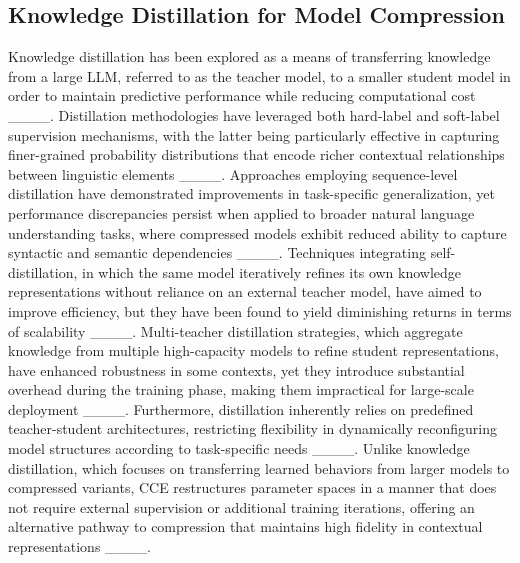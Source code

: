 \subsection{Knowledge Distillation for Model Compression}
Knowledge distillation has been explored as a means of transferring knowledge from a large LLM, referred to as the teacher model, to a smaller student model in order to maintain predictive performance while reducing computational cost ____. Distillation methodologies have leveraged both hard-label and soft-label supervision mechanisms, with the latter being particularly effective in capturing finer-grained probability distributions that encode richer contextual relationships between linguistic elements ____. Approaches employing sequence-level distillation have demonstrated improvements in task-specific generalization, yet performance discrepancies persist when applied to broader natural language understanding tasks, where compressed models exhibit reduced ability to capture syntactic and semantic dependencies ____. Techniques integrating self-distillation, in which the same model iteratively refines its own knowledge representations without reliance on an external teacher model, have aimed to improve efficiency, but they have been found to yield diminishing returns in terms of scalability ____. Multi-teacher distillation strategies, which aggregate knowledge from multiple high-capacity models to refine student representations, have enhanced robustness in some contexts, yet they introduce substantial overhead during the training phase, making them impractical for large-scale deployment ____. Furthermore, distillation inherently relies on predefined teacher-student architectures, restricting flexibility in dynamically reconfiguring model structures according to task-specific needs ____. Unlike knowledge distillation, which focuses on transferring learned behaviors from larger models to compressed variants, CCE restructures parameter spaces in a manner that does not require external supervision or additional training iterations, offering an alternative pathway to compression that maintains high fidelity in contextual representations ____. 

